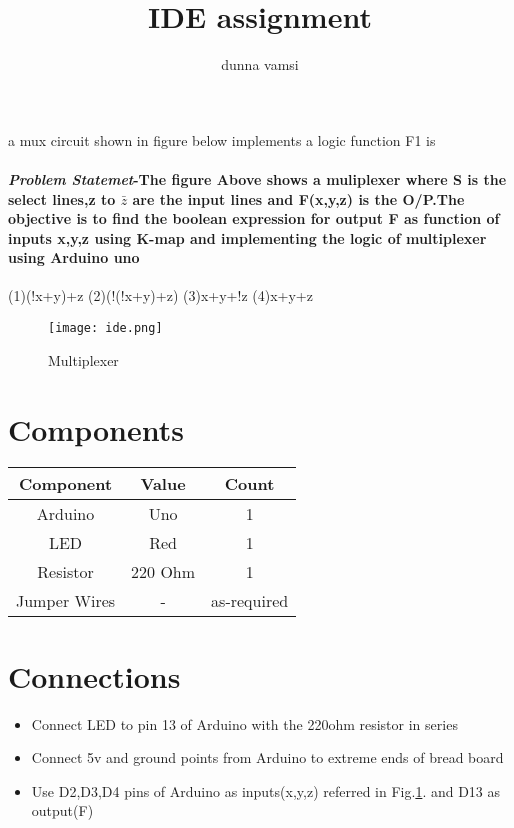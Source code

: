 \documentclass[journal,10pt,twocolumn]{article}
\title{IDE assignment}
\author{dunna vamsi}
\begin{document}
\maketitle
a mux circuit shown in figure below implements a logic function F1 is


\paragraph{\textit{Problem Statemet}-The figure Above shows a muliplexer where S is the select lines,z to $\bar{z}$ are the input lines and F(x,y,z) is the O/P.The objective is to find the boolean expression for output F as function of inputs x,y,z using K-map and implementing the logic of multiplexer using Arduino uno}

(1)(!x+y)+z (2)(!(!x+y)+z)
(3)x+y+!z   (4)x+y+z

\begin{figure}[!h]
\centering
\texttt{[image: ide.png]}
\caption{Multiplexer}
\label{fig:mux}
\end{figure}

\section{ Components}
{
\centering
\begin{tabular}{|c|c|c|}
\hline
Component&Value&Count\\
\hline
Arduino &Uno& 1\\
\hline
LED & Red &1\\
\hline
Resistor&220 Ohm&1\\
\hline
Jumper Wires&-&as-required\\
\hline
\end{tabular}
}
\section{Connections}
\begin{itemize}

\item Connect LED to pin 13 of Arduino with the 220ohm resistor in series
\item Connect 5v and ground points from Arduino to extreme ends of bread board
\item Use D2,D3,D4 pins of Arduino as inputs(x,y,z) referred in Fig.\ref{fig:mux}.  and D13 as output(F)
\end{itemize}
\end{document}

